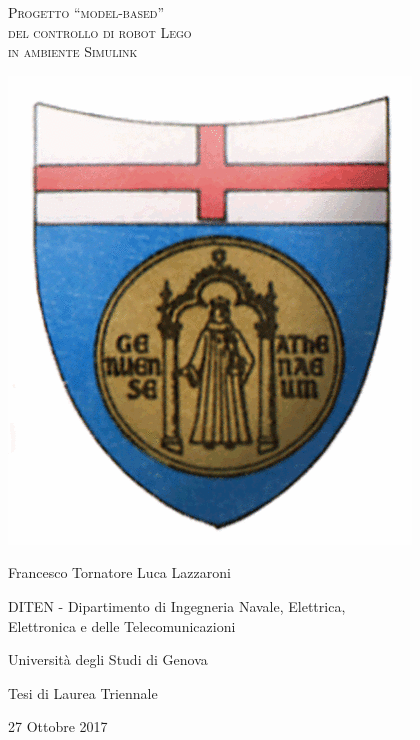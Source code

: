 \documentclass[a4paper,11pt,twoside]{book}
\begin{document}
\thispagestyle{empty}
\begin{center}
	\begin{Huge}
		\textsc{Progetto ``model-based''\\
				del controllo di robot Lego\\
				in ambiente Simulink\\}
	\end{Huge}
\end{center}
\vfill
\begin{center}
	\includegraphics[scale=0.4]{logo_unige.png}
\end{center}
\vfill
\begin{center}
	{\LARGE Francesco Tornatore Luca Lazzaroni}
\end{center}

\begin{center}
	{\Large DITEN - Dipartimento di Ingegneria Navale, Elettrica,\\
	Elettronica e delle Telecomunicazioni}
\end{center}
\begin{center}
	{\Large Università degli Studi di Genova}	
\end{center}
\vfill
\begin{center}
	Tesi di Laurea Triennale
\end{center}
\begin{center}
	27 Ottobre 2017
\end{center}
\end{document}
